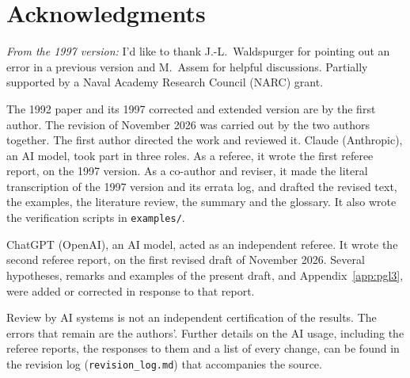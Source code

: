 \documentclass[12pt,letterpaper]{article}
\numberwithin{equation}{section}
\theoremstyle{plain}
\theoremstyle{remark}
\theoremstyle{plain}
\theoremstyle{definition}
\theoremstyle{remark}
\theoremstyle{remark}
\begin{document}
\section*{Acknowledgments}
\emph{From the 1997 version:} I'd like to thank J.-L.~Waldspurger for pointing out an error in a previous version and M.~Assem for helpful discussions. Partially supported by a Naval Academy Research Council (NARC) grant.

The 1992 paper and its 1997 corrected and extended version are by the first author. The revision of November 2026 was carried out by the two authors together. The first author directed the work and reviewed it. Claude (Anthropic), an AI model, took part in three roles. As a referee, it wrote the first referee report, on the 1997 version. As a co-author and reviser, it made the literal transcription of the 1997 version and its errata log, and drafted the revised text, the examples, the literature review, the summary and the glossary. It also wrote the verification scripts in \texttt{examples/}.

ChatGPT (OpenAI), an AI model, acted as an independent referee. It wrote the second referee report, on the first revised draft of November 2026. Several hypotheses, remarks and examples of the present draft, and Appendix~\ref{app:pgl3}, were added or corrected in response to that report.

Review by AI systems is not an independent certification of the results. The errors that remain are the authors'. Further details on the AI usage, including the referee reports, the responses to them and a list of every change, can be found in the revision log (\texttt{revision\_log.md}) that accompanies the source.
\end{document}
